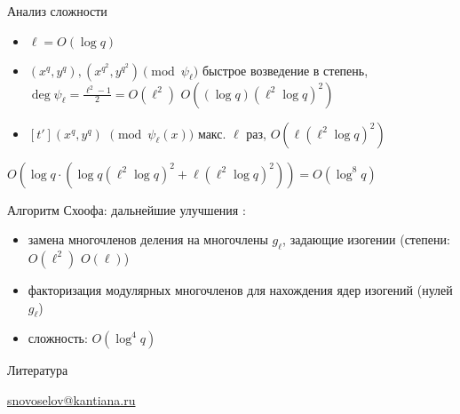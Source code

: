 \documentclass{beamer}
\begin{document}
\begin{frame}{Анализ сложности}
\begin{itemize}
    \item $\ell = O(\log{q})$
    \item $(x^q, y^q), (x^{q^2}, y^{q^2}) \pmod{\psi_\ell} $ \structure{$\implies$} быстрое возведение в степень, $\deg{\psi_\ell} = \frac{\ell^2 - 1}{2} = O(\ell^2)$ \structure{$\implies$} $O((\log{q}) (\ell^2 \log{q})^2)$
    \item $[t'](x^q, y^q)$ $\pmod{\psi_\ell(x)}$ \structure{$\implies$} макс. $\ell$ раз, $O(\ell (\ell^2 \log{q})^2)$
\end{itemize}
 $O(\log{q} \cdot (\log{q} (\ell^2 \log{q})^2 + \ell (\ell^2 \log{q})^2)) = O(\log^8{q})$
\end{frame}

\begin{frame}{Алгоритм Схоофа: дальнейшие улучшения}
    :
    \begin{itemize}
        \item замена многочленов деления на многочлены $g_\ell$, задающие изогении (степени: $O(\ell^2)$ \structure{$\implies$} $O(\ell)$)
        \item факторизация модулярных многочленов для нахождения ядер изогений (нулей $g_\ell$)
        \item сложность: $O(\log^4{q})$
    \end{itemize}
\end{frame}

\begin{frame}{Литература}
    \nocite{Blake1999}
    \nocite{Schoof1985}
    \nocite{CohenFrey+2005}
    \nocite{Washington2008}
    \printbibliography

    \begin{center}
        \begin{tcolorbox}[enhanced,hbox,colback=block-green-color-bg,colframe=subsection-color!120,title=Контакты,center title]
            \begin{varwidth}{\textwidth}
                \begin{center}
                    \href{mailto:snovoselov@kantiana.ru}{snovoselov@kantiana.ru}
                \end{center}
            \end{varwidth}
        \end{tcolorbox}	
    \end{center}
\end{frame}
\end{document}
